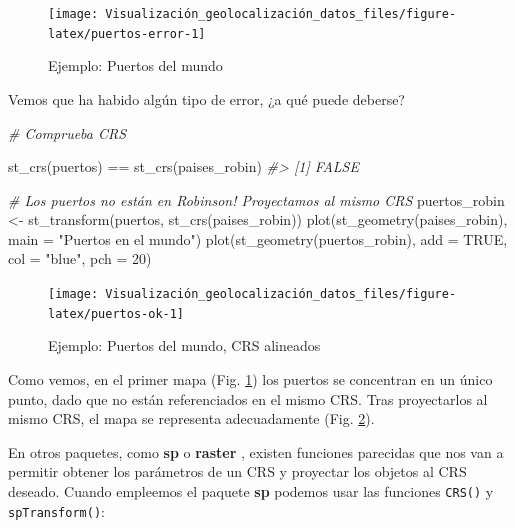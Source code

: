 \documentclass[
]{book}
\newenvironment{Shaded}{\begin{snugshade}}{\end{snugshade}}
\newcommand{\AttributeTok}[1]{\textcolor[rgb]{0.77,0.63,0.00}{#1}}
\newcommand{\CommentTok}[1]{\textcolor[rgb]{0.56,0.35,0.01}{\textit{#1}}}
\newcommand{\ConstantTok}[1]{\textcolor[rgb]{0.00,0.00,0.00}{#1}}
\newcommand{\DecValTok}[1]{\textcolor[rgb]{0.00,0.00,0.81}{#1}}
\newcommand{\FunctionTok}[1]{\textcolor[rgb]{0.00,0.00,0.00}{#1}}
\newcommand{\NormalTok}[1]{#1}
\newcommand{\OtherTok}[1]{\textcolor[rgb]{0.56,0.35,0.01}{#1}}
\newcommand{\SpecialCharTok}[1]{\textcolor[rgb]{0.00,0.00,0.00}{#1}}
\newcommand{\StringTok}[1]{\textcolor[rgb]{0.31,0.60,0.02}{#1}}
\theoremstyle{definition}
\theoremstyle{definition}
\theoremstyle{definition}
\theoremstyle{definition}
\theoremstyle{remark}
\begin{document}
\begin{figure}

{\centering \texttt{[image: Visualización\_geolocalización\_datos\_files/figure-latex/puertos-error-1]} 

}

\caption{Ejemplo: Puertos del mundo}\label{fig:puertos-error}
\end{figure}

Vemos que ha habido algún tipo de error, ¿a qué puede deberse?

\begin{Shaded}
\begin{Highlighting}[]
\CommentTok{\# Comprueba CRS}

\FunctionTok{st\_crs}\NormalTok{(puertos) }\SpecialCharTok{==} \FunctionTok{st\_crs}\NormalTok{(paises\_robin)}
\CommentTok{\#\textgreater{} [1] FALSE}

\CommentTok{\# Los puertos no están en Robinson! Proyectamos al mismo CRS}
\NormalTok{puertos\_robin }\OtherTok{\textless{}{-}} \FunctionTok{st\_transform}\NormalTok{(puertos, }\FunctionTok{st\_crs}\NormalTok{(paises\_robin))}
\FunctionTok{plot}\NormalTok{(}\FunctionTok{st\_geometry}\NormalTok{(paises\_robin), }\AttributeTok{main =} \StringTok{"Puertos en el mundo"}\NormalTok{)}
\FunctionTok{plot}\NormalTok{(}\FunctionTok{st\_geometry}\NormalTok{(puertos\_robin), }\AttributeTok{add =} \ConstantTok{TRUE}\NormalTok{, }\AttributeTok{col =} \StringTok{"blue"}\NormalTok{, }\AttributeTok{pch =} \DecValTok{20}\NormalTok{)}
\end{Highlighting}
\end{Shaded}

\begin{figure}

{\centering \texttt{[image: Visualización\_geolocalización\_datos\_files/figure-latex/puertos-ok-1]} 

}

\caption{Ejemplo: Puertos del mundo, CRS alineados}\label{fig:puertos-ok}
\end{figure}

Como vemos, en el primer mapa (Fig. \ref{fig:puertos-error}) los puertos se
concentran en un único punto, dado que no están referenciados en el mismo CRS.
Tras proyectarlos al mismo CRS, el mapa se representa adecuadamente (Fig.
\ref{fig:puertos-ok}).

En otros paquetes, como \textbf{sp} \citep{R-sp} o \textbf{raster} \citep{R-raster}, existen
funciones parecidas que nos van a permitir obtener los parámetros de un CRS y
proyectar los objetos al CRS deseado. Cuando empleemos el paquete \textbf{sp} podemos
usar las funciones \texttt{CRS()} y \texttt{spTransform()}:
\end{document}
